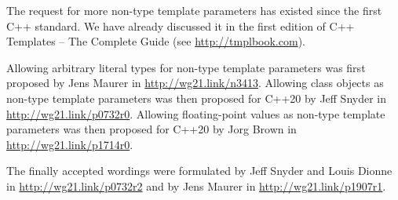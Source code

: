 
The request for more non-type template parameters has existed since the first C++ standard. We have already discussed it in the first edition of C++ Templates – The Complete Guide (see \url{http://tmplbook.com}).

Allowing arbitrary literal types for non-type template parameters was first proposed by Jens Maurer in \url{http://wg21.link/n3413}. Allowing class objects as non-type template parameters was then proposed for C++20 by Jeff Snyder in \url{http://wg21.link/p0732r0}. Allowing floating-point values as non-type template parameters was then proposed for C++20 by Jorg Brown in \url{http://wg21.link/p1714r0}.

The finally accepted wordings were formulated by Jeff Snyder and Louis Dionne in \url{http://wg21.link/p0732r2} and by Jens Maurer in \url{http://wg21.link/p1907r1}.